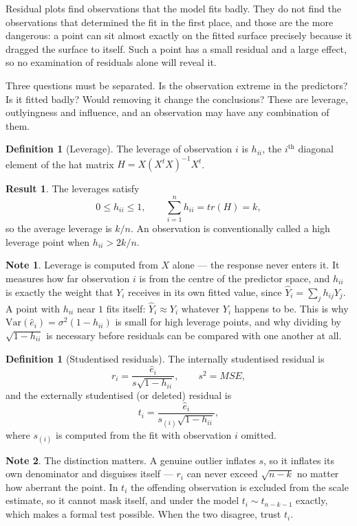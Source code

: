 \documentclass[11pt,a4paper]{article}
\theoremstyle{definition}
\newtheorem{defn}[thm]{Definition}
\newtheorem*{note}{Note}
\newtheorem{result}[thm]{Result}
\begin{document}
Residual plots find observations that the model fits badly. They do not find
the observations that determined the fit in the first place, and those are the
more dangerous: a point can sit almost exactly on the fitted surface precisely
because it dragged the surface to itself. Such a point has a small residual
and a large effect, so no examination of residuals alone will reveal it.

Three questions must be separated. Is the observation extreme in the
predictors? Is it fitted badly? Would removing it change the conclusions?
These are leverage, outlyingness and influence, and an observation may have
any combination of them.

\begin{defn}[Leverage]
The leverage of observation $i$ is $h_{ii}$, the $i^{\text{th}}$ diagonal
element of the hat matrix $H=X\left(X^tX\right)^{-1}X^t$.
\end{defn}

\begin{result}
\label{res:result:leverage}
The leverages satisfy
$$0\leq h_{ii}\leq 1,\qquad \sum_{i=1}^{n}h_{ii}=tr(H)=k,$$
so the average leverage is $k/n$. An observation is conventionally called a
high leverage point when $h_{ii}>2k/n$.
\end{result}

\begin{note}
Leverage is computed from $X$ alone --- the response never enters it. It
measures how far observation $i$ is from the centre of the predictor space,
and $h_{ii}$ is exactly the weight that $Y_i$ receives in its own fitted
value, since $\widehat{Y}_i=\sum_j h_{ij}Y_j$. A point with $h_{ii}$ near $1$
fits itself: $\widehat{Y}_i\approx Y_i$ whatever $Y_i$ happens to be. This is
why $\text{Var}\left(\widehat{e}_i\right)=\sigma^2\left(1-h_{ii}\right)$ is
small for high leverage points, and why dividing by $\sqrt{1-h_{ii}}$ is
necessary before residuals can be compared with one another at all.
\end{note}

\begin{defn}[Studentised residuals]
The internally studentised residual is
$$r_i=\frac{\widehat{e}_i}{s\sqrt{1-h_{ii}}},\qquad s^2=MSE,$$
and the externally studentised (or deleted) residual is
$$t_i=\frac{\widehat{e}_i}{s_{(i)}\sqrt{1-h_{ii}}},$$
where $s_{(i)}$ is computed from the fit with observation $i$ omitted.
\end{defn}

\begin{note}
The distinction matters. A genuine outlier inflates $s$, so it inflates its
own denominator and disguises itself --- $r_i$ can never exceed
$\sqrt{n-k}$ no matter how aberrant the point. In $t_i$ the offending
observation is excluded from the scale estimate, so it cannot mask itself, and
under the model $t_i\sim t_{n-k-1}$ exactly, which makes a formal test
possible. When the two disagree, trust $t_i$.
\end{note}
\end{document}
